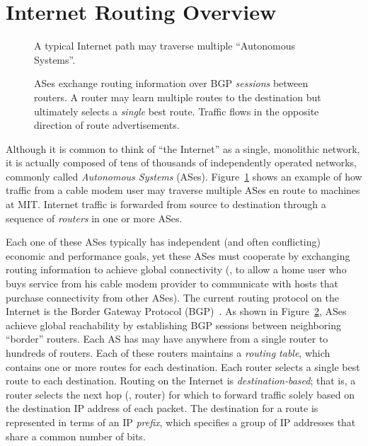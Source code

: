 \section{Internet Routing Overview}\label{sec:intro:overview}

\begin{figure}[b!]
\centering{}
\caption[Overview of the Internet's structure]{A typical Internet path may traverse multiple ``Autonomous Systems''.}
\label{fig:intro:overview}
\end{figure}

\begin{figure}[t]
\centering{}
\caption[How ASes exchange routing information]{ASes exchange routing
information over BGP {\em sessions} between 
  routers.  A router may learn multiple routes to the destination but
  ultimately selects a {\em single} best route.  Traffic flows in the opposite
  direction of route advertisements.}
\label{fig:intro:rtgtable}
\end{figure}



Although it is common to think of ``the Internet'' as a single, monolithic
network, it is actually composed of tens of thousands of independently
operated networks, commonly called {\em Autonomous Systems} (ASes).
Figure~\ref{fig:intro:overview} shows an example of how traffic from a cable
modem user may traverse multiple ASes en route to machines at MIT.
Internet traffic is forwarded from source to destination through a
sequence of {\em routers} in one or more ASes.  

Each one of these ASes typically has independent (and often
conflicting) economic and performance goals, yet these ASes must cooperate by
exchanging routing information to achieve global connectivity (\eg, to
allow a home user who buys service from his cable modem provider to
communicate with hosts that purchase connectivity from other ASes).
The current routing protocol on the Internet is the Border Gateway
Protocol (BGP)~\cite{rfc1771}.  As shown in
Figure~\ref{fig:intro:rtgtable}, ASes achieve global reachability by
establishing BGP sessions between neighboring ``border'' routers.  Each
AS has may have anywhere from a single router to hundreds of routers. 
%
Each of these routers maintains a {\em routing table}, which contains
one or more routes for each destination.  Each router
selects a single best route to each destination.  Routing on the Internet
is {\em destination-based}; that is, a router selects the next hop (\ie,
router) for which to forward traffic solely based on the destination IP
address of each packet.  The destination for a route is represented in
terms of an IP {\em prefix}, which specifies a group of IP addresses
that share a common number of bits.


